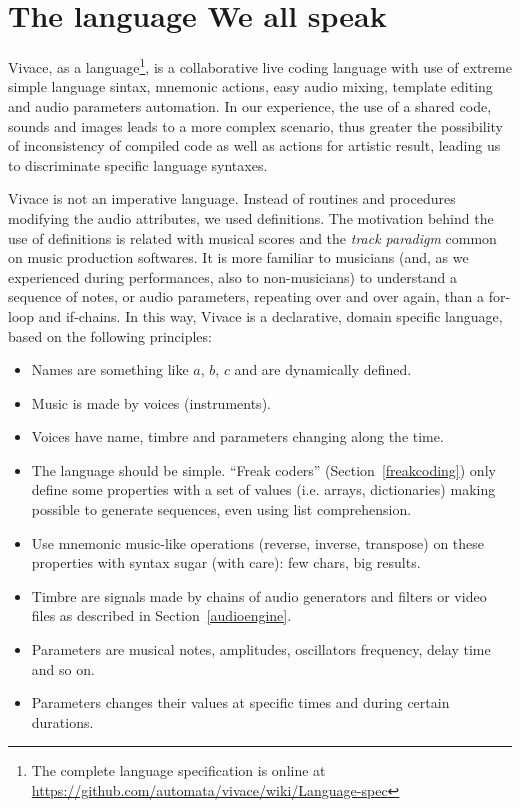 \documentclass[letterpaper, 12pt]{article}
\begin{document}
\section{The language We all speak}

Vivace, as a language\footnote{The complete language specification is
  online at
  \url{https://github.com/automata/vivace/wiki/Language-spec}}, is a
collaborative live coding language with use of extreme simple language
sintax, mnemonic actions, easy audio mixing, template editing and
audio parameters automation. In our experience, the use of a shared
code, sounds and images leads to a more complex scenario, thus greater
the possibility of inconsistency of compiled code as well as actions
for artistic result, leading us to discriminate specific language
syntaxes.

Vivace is not an imperative language. Instead of routines and
procedures modifying the audio attributes, we used definitions. The
motivation behind the use of definitions is related with musical
scores and the \emph{track paradigm} common on music production
softwares. It is more familiar to musicians (and, as we experienced
during performances, also to non-musicians) to understand a sequence
of notes, or audio parameters, repeating over and over again, than a
for-loop and if-chains. In this way, Vivace is a declarative, domain
specific language, based on the following principles:

\begin{itemize}
  
\item Names are something like $a$, $b$, $c$ and are dynamically defined.
\item Music is made by voices (instruments).
\item Voices have name, timbre and parameters changing along the
  time.  
\item The language should be simple. ``Freak coders''
  (Section~\ref{freakcoding}) only define some properties with a set
  of values (i.e. arrays, dictionaries) making possible to generate
  sequences, even using list comprehension.
\item Use mnemonic music-like operations (reverse, inverse, transpose)
  on these properties with syntax sugar (with care): few chars, big
  results.
\item Timbre are signals made by chains of audio generators and
  filters or video files as described in Section~\ref{audioengine}.
\item Parameters are musical notes, amplitudes, oscillators frequency,
  delay time and so on.
\item Parameters changes their values at specific times and during
  certain durations.

\end{itemize}
\end{document}
